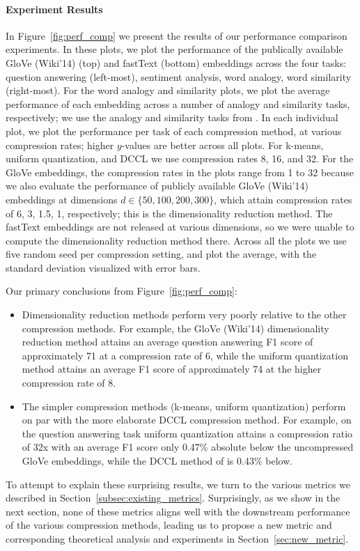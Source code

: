 \paragraph{Experiment Results}
In Figure~\ref{fig:perf_comp} we present the results of our performance comparison experiments.
In these plots, we plot the performance of the publically available GloVe (Wiki'14) (top) and fastText (bottom) embeddings across the four tasks: question answering (left-most), sentiment analysis, word analogy, word similarity (right-most).
For the word analogy and similarity plots, we plot the average performance of each embedding across a number of analogy and similarity tasks, respectively;
we use the analogy and similarity tasks from \citet{levy15}.
In each individual plot, we plot the performance per task of each compression method, at various compression rates;
higher $y$-values are better across all plots.
For k-means, uniform quantization, and DCCL we use compression rates 8, 16, and 32.
For the GloVe embeddings, the compression rates in the plots range from 1 to 32 because we also evaluate the performance of publicly available GloVe (Wiki'14) embeddings at dimensions $d\in\{50,100,200,300\}$, which attain compression rates of 6, 3, 1.5, 1, respectively;
this is the dimensionality reduction method.
The fastText embeddings are not released at various dimensions, so we were unable to compute the dimensionality reduction method there.
Across all the plots we use five random seed per compression setting, and plot the average, with the standard deviation visualized with error bars.

Our primary conclusions from Figure~\ref{fig:perf_comp}:
\begin{itemize}
\item Dimensionality reduction methods perform very poorly relative to the other compression methods.
For example, the GloVe (Wiki'14) dimensionality reduction method attains an average question answering F1 score of approximately 71 at a compression rate of 6, while the uniform quantization method attains an average F1 score of approximately 74 at the higher compression rate of 8.
\item The simpler compression methods (k-means, uniform quantization) perform on par with the more elaborate DCCL compression method.
For example, on the question answering task uniform quantization attains a compression ratio of 32x with an average F1 score only 0.47\% absolute below the uncompressed GloVe embeddings, while the DCCL method of \citet{dccl17} is 0.43\% below.
\end{itemize}
To attempt to explain these surprising results, we turn to the various metrics we described in Section~\ref{subsec:existing_metrics}.
Surprisingly, as we show in the next section, none of these metrics aligns well with the downstream performance of the various compression methods, leading us to propose a new metric and corresponding theoretical analysis and experiments in Section~\ref{sec:new_metric}.

